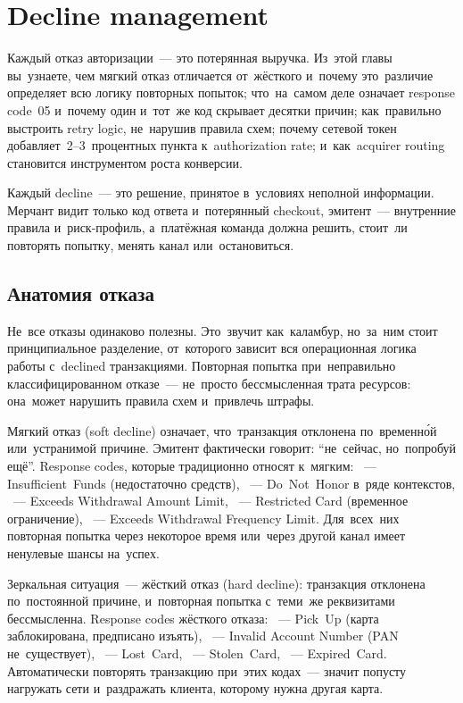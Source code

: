 \chapter{Decline management}
\label{ch:decline-management}

\begin{kaobox}[title=Что вы узнаете из этой главы]
  Каждый отказ авторизации~--- это потерянная выручка. Из~этой главы вы~узнаете,
  чем мягкий отказ отличается от~жёсткого и~почему это~различие определяет
  всю логику повторных попыток; что~на~самом деле означает response code~05
  и~почему один и~тот~же код скрывает десятки причин; как~правильно
  выстроить retry logic, не~нарушив правила схем; почему сетевой токен
  добавляет~2--3~процентных пункта к~authorization rate; и~как~acquirer
  routing становится инструментом роста конверсии.
\end{kaobox}

Каждый decline~--- это решение, принятое в~условиях неполной
информации. Мерчант видит только код ответа и~потерянный checkout,
эмитент~--- внутренние правила и~риск-профиль, а~платёжная команда
должна решить, стоит~ли повторять попытку, менять канал
или~остановиться.


\section{Анатомия отказа}
\label{sec:decline-anatomy}

Не~все отказы одинаково полезны. Это~звучит как~каламбур, но~за~ним стоит
принципиальное разделение, от~которого зависит вся операционная логика
работы с~declined транзакциями. Повторная попытка при~неправильно
классифицированном отказе~--- не~просто бессмысленная трата ресурсов:
она~может нарушить правила схем и~привлечь штрафы.

Мягкий отказ (soft decline) означает, что~транзакция отклонена
по~временно́й или~устранимой причине. Эмитент фактически говорит:
\enquote{не~сейчас, но~попробуй ещё}. Response codes, которые традиционно
относят к~мягким: ~--- Insufficient~Funds (недостаточно средств),
~--- Do~Not~Honor в~ряде контекстов, ~--- Exceeds Withdrawal
Amount Limit, ~--- Restricted Card (временное ограничение),
~--- Exceeds Withdrawal Frequency Limit. Для~всех~них повторная
попытка через некоторое время или~через другой канал имеет ненулевые
шансы на~успех.

Зеркальная ситуация~--- жёсткий отказ (hard decline): транзакция отклонена
по~постоянной причине, и~повторная попытка с~теми~же реквизитами
бессмысленна. Response codes жёсткого отказа: ~--- Pick~Up
(карта заблокирована, предписано изъять), ~--- Invalid Account Number
(PAN не~существует), ~--- Lost~Card, ~--- Stolen~Card,
~--- Expired~Card. Автоматически повторять транзакцию при~этих
кодах~--- значит попусту нагружать сети и~раздражать клиента, которому
нужна другая карта.

